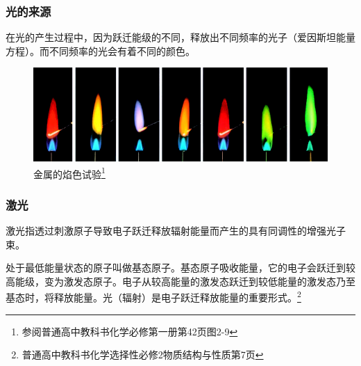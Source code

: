 \documentclass[8pt, aspectratio=169]{ctexbeamer}
\begin{document}
\begin{frame}[allowframebreaks]
	\frametitle{光的来源}
	在光的产生过程中，因为跃迁能级的不同，释放出不同频率的光子（爱因斯坦能量方程）。而不同频率的光会有着不同的颜色。
	\begin{table}
		\caption{焰色表\footnote{参阅普通高中教科书化学必修第一册第42页表\underline{一些金属元素的焰色}}}
	\end{table}

	\begin{figure}
		\includegraphics[width=\linewidth]{flametest.png}
		\caption{金属的焰色试验\footnote{参阅普通高中教科书化学必修第一册第42页图2-9}}
	\end{figure}
\end{frame}

\begin{frame}
	\frametitle{激光}
	\begin{definition}[激光]
		激光指透过刺激原子导致电子跃迁释放辐射能量而产生的具有同调性的增强光子束。
	\end{definition}
	处于最低能量状态的原子叫做基态原子。基态原子吸收能量，它的电子会跃迁到较高能级，变为激发态原子。电子从较高能量的激发态跃迁到较低能量的激发态乃至基态时，将释放能量。光（辐射）是电子跃迁释放能量的重要形式。\footnote{普通高中教科书化学选择性必修2物质结构与性质第7页}
\end{frame}



\end{document}
